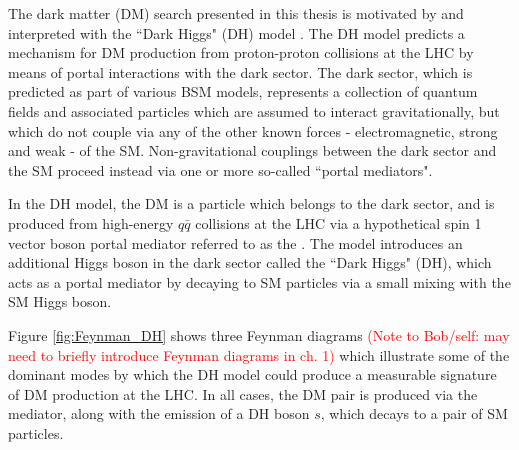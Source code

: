 \label{chapter:dh_model}

The dark matter (DM) search presented in this thesis is motivated by and interpreted with the ``Dark Higgs" (DH) model \cite{Duerr2017}. The DH model predicts a mechanism for DM production from proton-proton collisions at the LHC by means of portal interactions with the dark sector. The dark sector, which is predicted as part of various BSM models, represents a collection of quantum fields and associated particles which are assumed to interact gravitationally, but which do not couple via any of the other known forces - electromagnetic, strong and weak - of the SM. Non-gravitational couplings between the dark sector and the SM proceed instead via one or more so-called ``portal mediators". 

In the DH model, the DM is a particle which belongs to the dark sector, and is produced from high-energy \(q\bar{q}\) collisions at the LHC via a hypothetical spin 1 vector boson portal mediator referred to as the \Zprime. The model introduces an additional Higgs boson in the dark sector called the ``Dark Higgs" (DH), which acts as a portal mediator by decaying to SM particles via a small mixing with the SM Higgs boson. 

Figure \ref{fig:Feynman_DH} shows three Feynman diagrams \textcolor{red}{(Note to Bob/self: may need to briefly introduce Feynman diagrams in ch. 1)} which illustrate some of the dominant modes by which the DH model could produce a measurable signature of DM production at the LHC. In all cases, the DM pair is produced via the \Zprime mediator, along with the emission of a DH boson \(s\), which decays to a pair of SM particles. 

